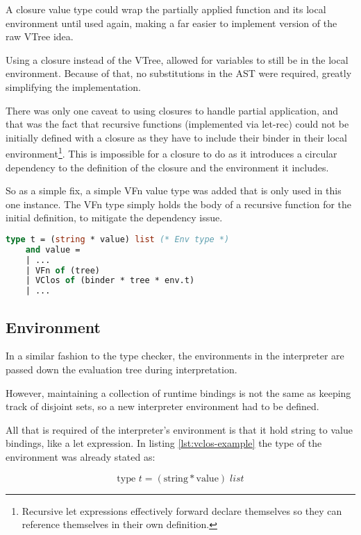 \documentclass{l4proj}
\begin{document}
A closure value type could wrap the partially applied function and its local environment until used again, making a far easier to implement version of the raw VTree idea.

Using a closure instead of the VTree, allowed for variables to still be in the local environment.
Because of that, no substitutions in the AST were required, greatly simplifying the implementation.

There was only one caveat to using closures to handle partial application, and that was the fact that recursive functions (implemented via let-rec) could not be initially defined with a closure as they have to include their binder in their local environment\footnote{Recursive let expressions effectively forward declare themselves so they can reference themselves in their own definition.}.
This is impossible for a closure to do as it introduces a circular dependency to the definition of the closure and the environment it includes.

So as a simple fix, a simple VFn value type was added that is only used in this one instance.
The VFn type simply holds the body of a recursive function for the initial definition, to mitigate the dependency issue.

\begin{lstlisting}[language=Caml, label=lst:vclos-example, caption=The aditional type definitions of a VClos and VFn.]
    type t = (string * value) list (* Env type *)
    and value = 
    | ...
    | VFn of (tree)
    | VClos of (binder * tree * env.t)
    | ...
\end{lstlisting}

\subsection{Environment}

In a similar fashion to the type checker, the environments in the interpreter are passed down the evaluation tree during interpretation.

However, maintaining a collection of runtime bindings is not the same as keeping track of disjoint sets, so a new interpreter environment had to be defined.

All that is required of the interpreter's environment is that it hold string to value bindings, like a let expression.
In listing \ref{lst:vclos-example} the type of the environment was already stated as:

\[\text{type } t = (\text{string} * \text{value}) \;list\]
\end{document}
